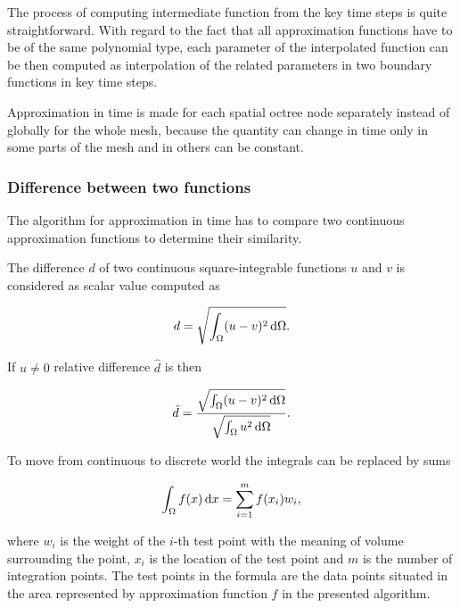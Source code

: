 The process of computing intermediate function from the key time steps is quite straightforward. With regard to the fact that all approximation functions have to be of the same polynomial type, each parameter of the interpolated function can be then computed as interpolation of the related parameters in two boundary functions in key time steps.

Approximation in time is made for each spatial octree node separately instead of globally for the whole mesh, because the quantity can change in time only in some parts of the mesh and in others can be constant.


\subsubsection{Difference between two functions}

The algorithm for approximation in time has to compare two continuous approximation functions to determine their similarity.

The difference $d$ of two continuous square-integrable functions $u$ and $v$ is considered as scalar value computed as

\begin{equation}
  d = \sqrt{\int_{\Omega}(u-v)^2 \mathop{}\!\mathrm{d}\Omega}.
\end{equation}

If $u \neq 0$ relative difference $\hat{d}$ is then

\begin{equation}
  \hat{d} = \frac{\sqrt{\int_{\Omega}(u-v)^2\mathop{}\!\mathrm{d}\Omega}}{\sqrt{\int_{\Omega}u^2\mathop{}\!\mathrm{d}\Omega}}.
\end{equation}

To move from continuous to discrete world the integrals can be replaced by sums

\begin{equation}
  \int_{\Omega}f(x)\mathop{}\!\mathrm{d} x = \sum_{i=1}^{m}f(x_i) w_i,
\end{equation}

where $w_i$ is the weight of the $i$-th test point with the meaning of volume surrounding the point, $x_i$ is the location of the test point and $m$ is the number of integration points. The test points in the formula are the data points situated in the area represented by approximation function $f$ in the presented algorithm.

